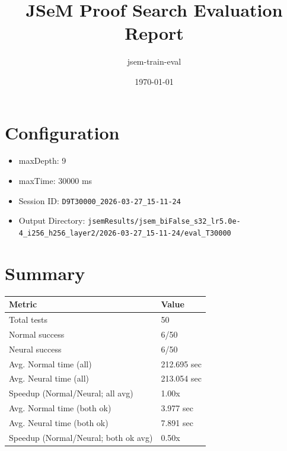 \documentclass[a4paper,10pt]{article}
\title{JSeM Proof Search Evaluation Report}
\author{jsem-train-eval}
\date{\today}
\begin{document}
\maketitle

\section{Configuration}
\begin{itemize}
\item maxDepth: 9
\item maxTime: 30000 ms
\item Session ID: \texttt{D9T30000\_2026-03-27\_15-11-24}
\item Output Directory: \texttt{jsemResults/jsem\_biFalse\_s32\_lr5.0e-4\_i256\_h256\_layer2/2026-03-27\_15-11-24/eval\_T30000}
\end{itemize}

\section{Summary}
\begin{tabular}{ll}
\toprule
\textbf{Metric} & \textbf{Value} \\
\midrule
Total tests & 50 \\
Normal success & 6/50 \\
Neural success & 6/50 \\
\midrule
Avg. Normal time (all) & 212.695 sec \\
Avg. Neural time (all) & 213.054 sec \\
Speedup (Normal/Neural; all avg) & 1.00x \\
Avg. Normal time (both ok) & 3.977 sec \\
Avg. Neural time (both ok) & 7.891 sec \\
Speedup (Normal/Neural; both ok avg) & 0.50x \\
\bottomrule
\end{tabular}
\end{document}
